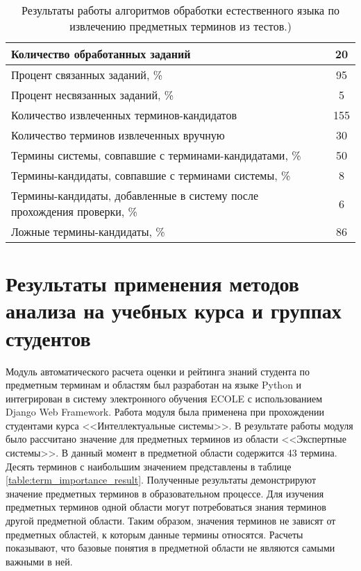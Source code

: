 \begin{table}[h!]
\centering
\caption{Результаты работы алгоритмов обработки естественного языка по извлечению предметных терминов из тестов.)}
\label{table:nlp_resutls}
\begin{tabular}{ |p{12cm}|c|  }
\hline Количество обработанных заданий & 20 \\
\hline Процент связанных заданий, \% & 95 \\
\hline Процент несвязанных заданий, \% & 5 \\
\hline Количество извлеченных терминов-кандидатов & 155 \\
\hline Количество терминов извлеченных вручную & 30 \\
\hline Термины системы, совпавшие с терминами-кандидатами, \% & 50 \\
\hline Термины-кандидаты, совпавшие с терминами системы, \% & 8 \\
\hline Термины-кандидаты, добавленные в систему после прохождения проверки, \%  & 6 \\
\hline Ложные термины-кандидаты, \% & 86 \\
\hline
\end{tabular}
\end{table}  


\section{Результаты применения методов анализа на учебных курса и группах студентов} \label{sect4_5}

Модуль автоматического расчета оценки и рейтинга знаний студента по предметным терминам и областям был разработан на языке Python и интегрирован в систему электронного обучения ECOLE с использованием Django Web Framework. Работа модуля была применена при прохождении студентами курса <<Интеллектуальные системы>>. В результате работы модуля было рассчитано значение для предметных терминов из области <<Экспертные системы>>. В данный момент в предметной области содержится 43 термина. Десять терминов с наибольшим значением представлены в таблице \ref{table:term_importance_result}. Полученные результаты демонстрируют значение предметных терминов в образовательном процессе. Для изучения предметных терминов одной области могут потребоваться знания терминов другой предметной области. Таким образом, значения терминов не зависят от предметных областей, к которым данные термины относятся. Расчеты показывают, что базовые понятия в предметной области не являются самыми важными в ней.    

